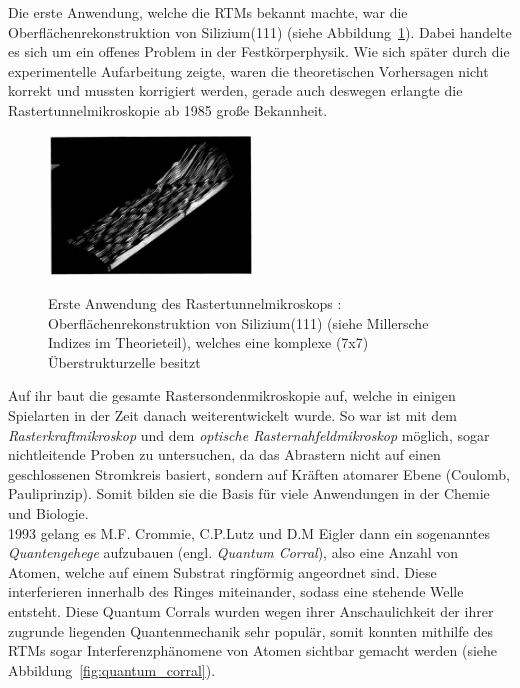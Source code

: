 Die erste Anwendung, welche die RTMs bekannt
machte, war die Oberflächenrekonstruktion von Silizium(111)  
\cite{binnig19837} (siehe Abbildung~\ref{fig:silicium}).
Dabei handelte es sich um ein offenes Problem in der
Festkörperphysik. Wie sich später durch die experimentelle
Aufarbeitung zeigte, waren die theoretischen Vorhersagen nicht 
korrekt und mussten korrigiert werden, gerade auch deswegen
erlangte die Rastertunnelmikroskopie ab 1985 große Bekannheit.
\begin{figure}

\centering
\caption{Erste Anwendung des Rastertunnelmikroskops 
\cite{binnig19837}: 
Oberflächenrekonstruktion von Silizium(111) (siehe Millersche
Indizes im Theorieteil), welches eine komplexe (7x7) 
Überstrukturzelle besitzt}

\includegraphics[width=0.48\textwidth]{pics/silicium}
 \label{fig:silicium}
\end{figure}
Auf ihr baut die gesamte Rastersondenmikroskopie auf, welche
in einigen Spielarten in der Zeit danach weiterentwickelt wurde.
So war ist mit dem \textit{Rasterkraftmikroskop}
und dem \textit{optische Rasternahfeldmikroskop} möglich, sogar
nichtleitende Proben zu untersuchen, da das Abrastern nicht auf
einen geschlossenen Stromkreis basiert, sondern auf Kräften 
atomarer Ebene (Coulomb, Pauliprinzip). Somit bilden sie die Basis
für viele Anwendungen in der Chemie und Biologie.\\
1993 gelang es M.F. Crommie, C.P.Lutz und
D.M Eigler \cite{crommie1993imaging} dann
ein sogenanntes \textit{Quantengehege} aufzubauen
        (engl. \textit{Quantum Corral}), also eine Anzahl
von Atomen, welche auf einem Substrat ringförmig angeordnet sind.
Diese interferieren innerhalb des Ringes miteinander, sodass 
eine stehende Welle entsteht. Diese Quantum Corrals wurden 
wegen ihrer Anschaulichkeit der ihrer zugrunde liegenden
Quantenmechanik sehr populär, somit konnten mithilfe
des RTMs sogar Interferenzphänomene von Atomen
sichtbar gemacht werden (siehe Abbildung~\ref{fig:quantum_corral}). 

